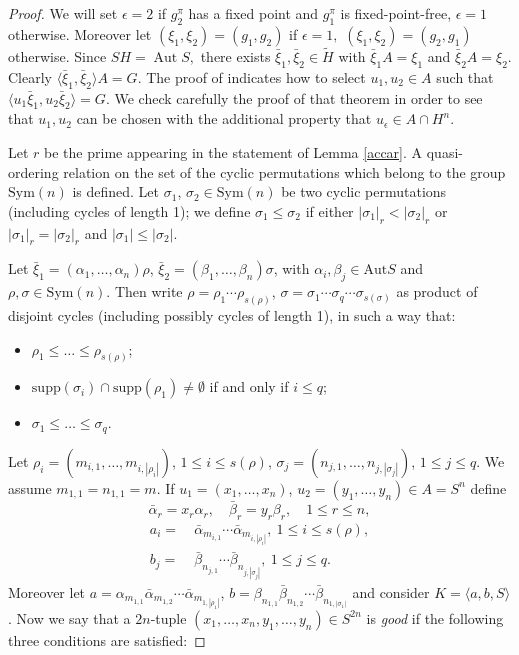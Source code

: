 \documentclass{amsart}
\DeclareMathOperator{\aut}{Aut}
\newcommand{\sym}{\mathrm{Sym}}
\newcommand{\supp}{\mathrm{supp}}
\newcommand{\Aut}{\mathrm{Aut}}
\numberwithin{equation}{section}
\begin{document}
\begin{proof}
We will set $\epsilon=2$ if $g_2^\pi$ has a fixed point and $g_1^\pi$ is fixed-point-free, $\epsilon=1$ otherwise. Moreover let
$(\xi_1,\xi_2)=(g_1,g_2)$ if $\epsilon=1,$ $(\xi_1,\xi_2)=(g_2,g_1)$
otherwise. Since $SH=\aut S,$ there exists
$\bar \xi_1, \bar \xi_2 \in \tilde H$ with $\bar \xi_1A=\xi_1$ and $\bar \xi_2A=\xi_2.$ Clearly $\langle \bar \xi_1, \bar \xi_2\rangle A=G.$ The proof of \cite[Theorem 1.1]{uni} indicates how to select $u_1, u_2 \in A$ such that $\langle u_1\bar \xi_1, u_2\bar \xi_2\rangle=G.$ 
We check carefully the proof of that theorem in order to see that $u_1, u_2$ can be chosen with the additional property that $u_\epsilon \in A \cap H^n$.

 Let $r$ be the prime appearing in the statement of Lemma \ref{accar}. A quasi-ordering relation on the set
	of the cyclic permutations which belong to the group $\sym(n)$ is defined. 
	Let $\sigma _1$, $\sigma _2 \in
	\sym(n)$ be two cyclic permutations (including cycles of
	length 1); we define $\sigma _1 \leq \sigma _2$ if either
	$|\sigma _1|_r <
	|\sigma _2|_r$  or
	$|\sigma _1|_r =|\sigma _2|_r$ and $|\sigma _1| \leq |\sigma
	_2|$.
	
	Let $\bar \xi_1=(\alpha_1,\dots,\alpha_n)\rho$,
	$\bar \xi_2=(\beta_1,\dots,\beta_n)\sigma$, with $\alpha_i, \beta_j \in \Aut S$
	and $\rho, \sigma \in \sym(n)$.
	Then write $\rho=\rho_1 \cdots \rho_{s(\rho)}$,
	$\sigma=\sigma_1 \cdots \sigma_q \cdots \sigma_{s(\sigma)}$
	as product of disjoint cycles (including possibly cycles of length 1),
	in such a way that:
	\begin{itemize}
		\item[a)] $\rho_1 \leq \dots \leq \rho_{s(\rho)}$;
		\item[b)] $\supp (\sigma _i) \cap \supp (\rho_1) \neq \emptyset$ if and only if
		$i \leq q$;
		\item[c)] $\sigma_1 \leq \dots \leq \sigma_q$.
	\end{itemize}
	
	Let $\rho_i=(m_{i,1},\dots,m_{i,|\rho_i|})$, $1 \leq i \leq s(\rho)$,
	$\sigma_j=(n_{j,1},\dots,n_{j,|\sigma_j|})$, $1 \leq j \leq q$. We assume
	$m_{1,1}=n_{1,1}=m$. 
If $u_1=(x_1,\dots,x_n)$, $u_2=(y_1,\dots,y_n) \in A=S^n$ define
	$$\bar \alpha_r=x_r\alpha_r,\quad \bar \beta_r=y_r\beta_r,\quad 1 \leq r \leq n,$$
	$$\begin{aligned}a_i =& \ \bar\alpha_{m_{i,1}} \cdots \bar\alpha_{m_{i,|\rho_i|}},
	\ 1 \leq i \leq s(\rho),\\
	b_j =&\ \bar\beta_{n_{j,1}} \cdots \bar\beta_{n_{j,|\sigma_j|}},
	\ 1 \leq j \leq q.\end{aligned}$$
		Moreover let
	$a =\alpha_{m_{1,1}} \bar\alpha_{m_{1,2}} \cdots \bar\alpha_{m_{1,|\rho_1|}}$,
	$b =\beta_{n_{1,1}} \bar\beta_{n_{1,2}} \cdots \bar\beta_{n_{1,|\sigma_1|}}$ and consider
	$K=\langle a, b, S \rangle$. 
Now we say  that a $2n$-tuple $(x_1,\dots,x_n,y_1,\dots,y_n)\in S^{2n}$ is {\em good} if the following three conditions are satisfied:
	

\end{proof}
\end{document}
